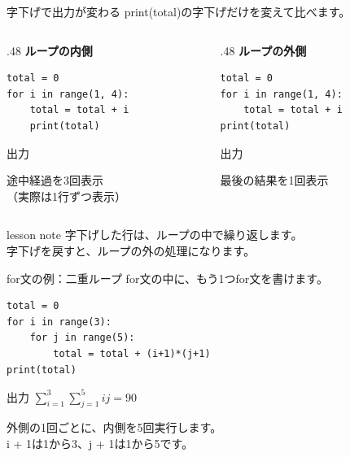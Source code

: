 \documentclass[12pt,aspectratio=43]{beamer}
\newcommand{\code}[1]{{\codefont #1}}
\newcommand{\result}[1]{%
  \par\vspace{1mm}%
  {\small\textcolor{black!60}{出力}}\quad
  {\codefont\fontsize{16}{18}\selectfont #1}\par}
\newenvironment{lessonbox}
  {\begin{beamercolorbox}[wd=\linewidth,sep=1.5mm]{lesson note}}
  {\end{beamercolorbox}\par}
\begin{document}
\begin{frame}[t,fragile]{字下げで出力が変わる}
  \setlength{\parskip}{0pt}
  \code{print(total)}の字下げだけを変えて比べます。
  \par\vspace{1mm}
  \begin{columns}[T,onlytextwidth]
    \begin{column}{.48\textwidth}
      \textcolor{courseblue}{\textbf{ループの内側}}
\begin{lstlisting}[basicstyle=\codefont\fontsize{12}{14}\selectfont,aboveskip=1mm,belowskip=0mm]
total = 0
for i in range(1, 4):
    total = total + i
    print(total)
\end{lstlisting}
      \result{1}
      \vspace{0mm}
      {\small 途中経過を3回表示\\
        （実際は1行ずつ表示）\par}
    \end{column}
    \begin{column}{.48\textwidth}
      \textcolor{courseblue}{\textbf{ループの外側}}
\begin{lstlisting}[basicstyle=\codefont\fontsize{12}{14}\selectfont,aboveskip=1mm,belowskip=0mm]
total = 0
for i in range(1, 4):
    total = total + i
print(total)
\end{lstlisting}
      \result{6}
      \vspace{0mm}
      {\small 最後の結果を1回表示\par}
    \end{column}
  \end{columns}
  \vspace{1mm}
  \begin{lessonbox}
    \small 字下げした行は、ループの中で繰り返します。\\[1mm]
    字下げを戻すと、ループの外の処理になります。
  \end{lessonbox}
\end{frame}

\begin{frame}[t,fragile]{for文の例：二重ループ}
  \setlength{\parskip}{0pt}
  \code{for}文の中に、もう1つ\code{for}文を書けます。
\begin{lstlisting}[basicstyle=\codefont\fontsize{14}{16}\selectfont]
total = 0
for i in range(3):
    for j in range(5):
        total = total + (i+1)*(j+1)
print(total)
\end{lstlisting}
  \par\vspace{1mm}
  {\small\textcolor{black!60}{出力}}\quad
  {\codefont\fontsize{16}{18}}
  \hspace{8mm}\(\displaystyle \sum_{i=1}^{3}\sum_{j=1}^{5} ij = 90\)\par
  \vspace{1mm}
  {\small 外側の1回ごとに、内側を5回実行します。\\
    \code{i + 1}は1から3、\code{j + 1}は1から5です。\par}
\end{frame}
\end{document}
